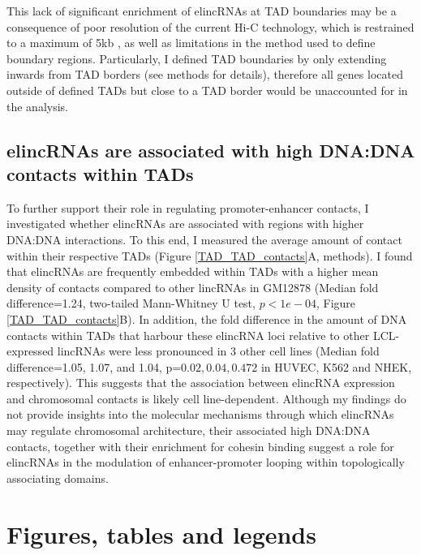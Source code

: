 \documentclass[11pt,a4paper]{report}
\begin{document}
This lack of significant enrichment of elincRNAs at TAD boundaries may be a consequence of poor resolution of the current Hi-C technology, which is restrained to a maximum of 5kb \cite{Rao2014}⁠, as well as limitations in the method used to define boundary regions. Particularly, I defined TAD boundaries by only extending inwards from TAD borders (see methods for details), therefore all genes located outside of defined TADs but close to a TAD border would be unaccounted for in the analysis. 


\subsection*{elincRNAs are associated with high DNA:DNA contacts within TADs}

To further support their role in regulating promoter-enhancer contacts, I investigated whether elincRNAs are associated with regions with higher DNA:DNA interactions. To this end, I measured the average amount of contact within their respective TADs (Figure \ref{TAD_TAD_contacts}A, methods). I found that elincRNAs are frequently embedded within TADs with a higher mean density of contacts compared to other lincRNAs in GM12878 (Median fold difference=1.24, two-tailed Mann-Whitney U test, $p<1e-04$, Figure \ref{TAD_TAD_contacts}B). In addition, the fold difference in the amount of DNA contacts within TADs that harbour these elincRNA loci relative to other LCL-expressed lincRNAs were less pronounced in 3 other cell lines (Median fold difference=1.05, 1.07, and 1.04, p=$0.02, 0.04, 0.472$ in HUVEC, K562 and NHEK, respectively). This suggests that the association between elincRNA expression and chromosomal contacts is likely cell line-dependent. 
Although my findings do not provide insights into the molecular mechanisms through which elincRNAs may regulate chromosomal architecture, their associated high DNA:DNA contacts, together with their enrichment for cohesin binding suggest a role for elincRNAs in the modulation of enhancer-promoter looping within topologically associating domains.

\section*{Figures, tables and legends}
\end{document}
